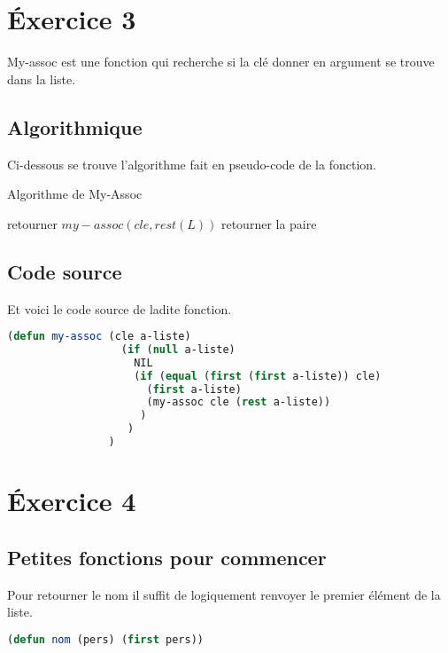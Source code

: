 \documentclass[a4paper, 12pt, leqno]{report}
\theoremstyle{plain}
\begin{document}
        \chapter{\'Exercice 3}       
            My-assoc est une fonction qui recherche si la clé donner en argument se trouve dans la liste.
        \section{Algorithmique}
        Ci-dessous se trouve l'algorithme fait en pseudo-code de la fonction.
        \begin{algorithm}
            \caption{Algorithme de My-Assoc}
            \begin{algorithmic}
                    \State retourner $my-assoc(cle,rest(L))$
                \Else
                    \State retourner la paire
                \EndIf      
            \end{algorithmic}
            \end{algorithm}
            \section{Code source}
            Et voici le code source de ladite fonction.
            \begin{lstlisting}[label=some-code,caption=My\_{}Assoc (cle a-liste) version récusive,language=lisp]
                (defun my-assoc (cle a-liste)
                  (if (null a-liste)
                    NIL
                    (if (equal (first (first a-liste)) cle) 
                      (first a-liste) 
                      (my-assoc cle (rest a-liste))
                     )
                   )
                )
            \end{lstlisting} 
            \newpage
            \chapter{\'Exercice 4}
                \section{Petites fonctions pour commencer}
                Pour retourner le nom il suffit de logiquement renvoyer le premier élément de la liste.
              \begin{lstlisting}[label=some-code,caption=nom(Personne),language=lisp]
                (defun nom (pers) (first pers))
            \end{lstlisting}
            
\end{document}
